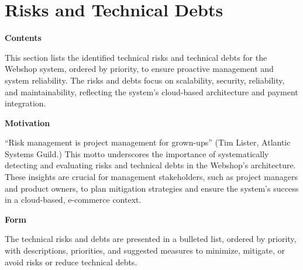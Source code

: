 \hypertarget{section-technical-risks}{%
\section{Risks and Technical Debts}\label{section-technical-risks}}

\textbf{Contents}

This section lists the identified technical risks and technical debts for the Webshop system, ordered by priority, to ensure proactive management and system reliability. The risks and debts focus on scalability, security, reliability, and maintainability, reflecting the system’s cloud-based architecture and payment integration.

\textbf{Motivation}

``Risk management is project management for grown-ups'' (Tim Lister, Atlantic Systems Guild.) This motto underscores the importance of systematically detecting and evaluating risks and technical debts in the Webshop’s architecture. These insights are crucial for management stakeholders, such as project managers and product owners, to plan mitigation strategies and ensure the system’s success in a cloud-based, e-commerce context.

\textbf{Form}

The technical risks and debts are presented in a bulleted list, ordered by priority, with descriptions, priorities, and suggested measures to minimize, mitigate, or avoid risks or reduce technical debts.

